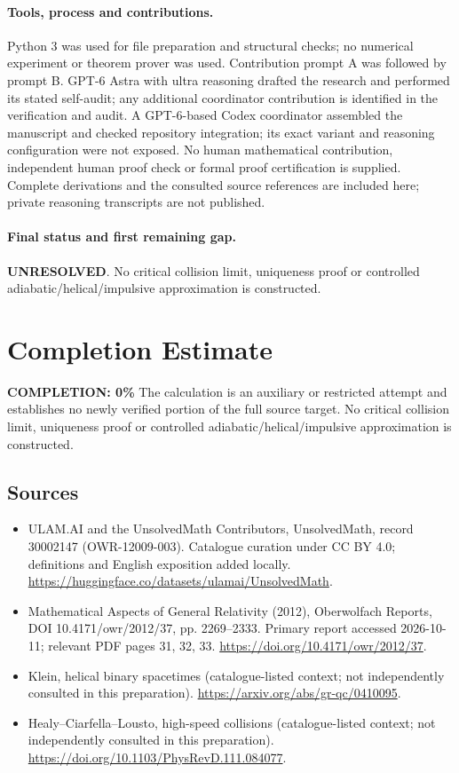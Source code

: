 \documentclass[11pt]{article}
\begin{document}
\paragraph{Tools, process and contributions.}
Python 3 was used for file preparation and structural checks; no numerical experiment or theorem prover was used. Contribution prompt A was followed by prompt B. GPT-6 Astra with ultra reasoning drafted the research and performed its stated self-audit; any additional coordinator contribution is identified in the verification and audit. A GPT-6-based Codex coordinator assembled the manuscript and checked repository integration; its exact variant and reasoning configuration were not exposed. No human mathematical contribution, independent human proof check or formal proof certification is supplied. Complete derivations and the consulted source references are included here; private reasoning transcripts are not published.

\paragraph{Final status and first remaining gap.}
\textbf{UNRESOLVED}. No critical collision limit, uniqueness proof or controlled adiabatic/helical/impulsive approximation is constructed.

\section{Completion Estimate}
\noindent\textbf{COMPLETION: 0\%}
The calculation is an auxiliary or restricted attempt and establishes no newly verified portion of the full source target. No critical collision limit, uniqueness proof or controlled adiabatic/helical/impulsive approximation is constructed.

\subsection{Sources}
\begin{itemize}
\item[\hypertarget{source:30002147:1}{S1}] ULAM.AI and the UnsolvedMath Contributors, UnsolvedMath, record 30002147 (OWR-12009-003). Catalogue curation under CC BY 4.0; definitions and English exposition added locally.
\url{https://huggingface.co/datasets/ulamai/UnsolvedMath}.
\item[\hypertarget{source:30002147:2}{S2}] Mathematical Aspects of General Relativity (2012), Oberwolfach Reports, DOI 10.4171/owr/2012/37, pp. 2269--2333. Primary report accessed 2026-10-11; relevant PDF pages 31, 32, 33.
\url{https://doi.org/10.4171/owr/2012/37}.
\item[\hypertarget{source:30002147:3}{S3}] Klein, helical binary spacetimes (catalogue-listed context; not independently consulted in this preparation).
\url{https://arxiv.org/abs/gr-qc/0410095}.
\item[\hypertarget{source:30002147:4}{S4}] Healy--Ciarfella--Lousto, high-speed collisions (catalogue-listed context; not independently consulted in this preparation).
\url{https://doi.org/10.1103/PhysRevD.111.084077}.
\end{itemize}
\label{end:30002147}
\end{document}
